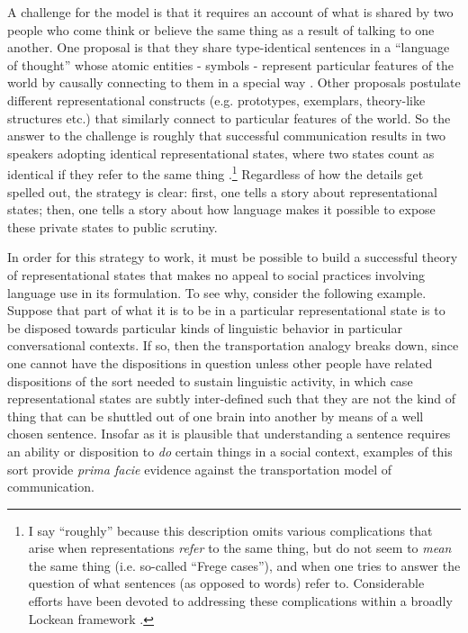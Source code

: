 A challenge for the model is that it requires an account of what is shared by two people who come think or believe the same thing as a result of talking to one another. One proposal is that they share type-identical sentences in a ``language of thought'' whose atomic entities - symbols - represent particular features of the world by causally connecting to them in a special way \citep{Fodor:1998}. Other proposals postulate different representational constructs (e.g. prototypes, exemplars, theory-like structures etc.) that similarly connect to particular features of the world. So the answer to the challenge is roughly that successful communication results in two speakers adopting identical representational states, where two states count as identical if they refer to the same thing \citep{Fodor:1998,Horwich:2005}.\footnote{I say ``roughly'' because this description omits various complications that arise when representations \textit{refer} to the same thing, but do not seem to \textit{mean} the same thing (i.e. so-called ``Frege cases''), and when one tries to answer the question of what sentences (as opposed to words) refer to. Considerable efforts have been devoted to addressing these complications within a broadly Lockean framework \citep[see e.g.,][]{Speaks:2014}.} Regardless of how the details get spelled out, the strategy is clear: first, one tells a story about representational states; then, one tells a story about how language makes it possible to expose these private states to public scrutiny. 

In order for this strategy to work, it must be possible to build a successful theory of representational states that makes no appeal to social practices involving language use in its formulation. To see why, consider the following example. Suppose that part of what it is to be in a particular representational state is to be disposed towards particular kinds of linguistic behavior in particular conversational contexts. If so, then the transportation analogy breaks down, since one cannot have the dispositions in question unless other people have related dispositions of the sort needed to sustain linguistic activity, in which case representational states are subtly inter-defined such that they are not the kind of thing that can be shuttled out of one brain into another by means of a well chosen sentence. Insofar as it is plausible that understanding a sentence requires an ability or disposition to \textit{do} certain things in a social context, examples of this sort provide \textit{prima facie} evidence against the transportation model of communication. 


